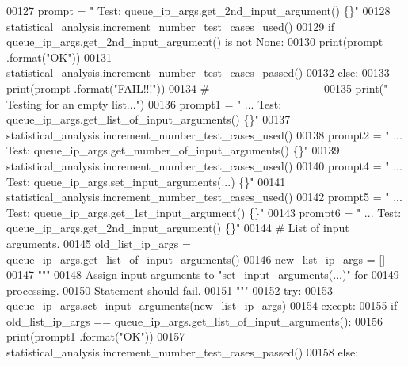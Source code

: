 \begin{DoxyCode}
00127         prompt = \textcolor{stringliteral}{"  Test: queue\_ip\_args.get\_2nd\_input\_argument()        \{\}"}
00128         statistical\_analysis.increment\_number\_test\_cases\_used()
00129         \textcolor{keywordflow}{if} queue\_ip\_args.get\_2nd\_input\_argument() \textcolor{keywordflow}{is} \textcolor{keywordflow}{not} \textcolor{keywordtype}{None}:
00130             print(prompt .format(\textcolor{stringliteral}{"OK"}))
00131             statistical\_analysis.increment\_number\_test\_cases\_passed()
00132         \textcolor{keywordflow}{else}:
00133             print(prompt .format(\textcolor{stringliteral}{"FAIL!!!"}))
00134         \textcolor{comment}{#   -   -   -   -   -   -   -   -   -   -   -   -   -   -   -}
00135         print(\textcolor{stringliteral}{" Testing for an empty list..."})
00136         prompt1 = \textcolor{stringliteral}{" ... Test: queue\_ip\_args.get\_list\_of\_input\_arguments()   \{\}"}
00137         statistical\_analysis.increment\_number\_test\_cases\_used()
00138         prompt2 = \textcolor{stringliteral}{" ... Test: queue\_ip\_args.get\_number\_of\_input\_arguments() \{\}"}
00139         statistical\_analysis.increment\_number\_test\_cases\_used()
00140         prompt4 = \textcolor{stringliteral}{" ... Test: queue\_ip\_args.set\_input\_arguments(...)    \{\}"}
00141         statistical\_analysis.increment\_number\_test\_cases\_used()
00142         prompt5 = \textcolor{stringliteral}{" ... Test: queue\_ip\_args.get\_1st\_input\_argument()    \{\}"}
00143         prompt6 = \textcolor{stringliteral}{" ... Test: queue\_ip\_args.get\_2nd\_input\_argument()    \{\}"}
00144         \textcolor{comment}{#   List of input arguments.}
00145         old\_list\_ip\_args = queue\_ip\_args.get\_list\_of\_input\_arguments()
00146         new\_list\_ip\_args = []
00147         \textcolor{stringliteral}{"""}
00148 \textcolor{stringliteral}{            Assign input arguments to "set\_input\_arguments(...)" for}
00149 \textcolor{stringliteral}{                processing.}
00150 \textcolor{stringliteral}{            Statement should fail.}
00151 \textcolor{stringliteral}{        """}
00152         \textcolor{keywordflow}{try}:
00153             queue\_ip\_args.set\_input\_arguments(new\_list\_ip\_args)
00154         \textcolor{keywordflow}{except}:
00155             \textcolor{keywordflow}{if} old\_list\_ip\_args == queue\_ip\_args.get\_list\_of\_input\_arguments():
00156                 print(prompt1 .format(\textcolor{stringliteral}{"OK"}))
00157                 statistical\_analysis.increment\_number\_test\_cases\_passed()
00158             \textcolor{keywordflow}{else}:

\end{DoxyCode}
